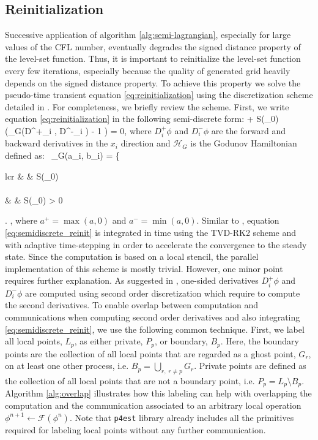 \subsection{Reinitialization}
Successive application of algorithm \ref{alg:semi-lagrangian}, especially for large values of the CFL number, eventually degrades the signed distance property of the level-set function. Thus, it is important to reinitialize the level-set function every few iterations, especially because the quality of generated grid heavily depends on the signed distance property. To achieve this property we solve the pseudo-time transient equation \eqref{eq:reinitialization} using the discretization scheme detailed in \cite{Min;Gibou:07:A-second-order-accur}. For completeness, we briefly review the scheme. First, we write equation \eqref{eq:reinitialization} in the following semi-discrete form:
\be
{} + S(\phi_0) \left(_G(D^+_i \phi, D^-_i \phi) - 1 \right) = 0,
\label{eq:semidiscrete_reinit}
\ee
where $D^+_i \phi$ and $D^-_i \phi$ are the forward and backward derivatives in the $x_i$ direction and $\mathcal{H}_G$ is the Godunov Hamiltonian defined as:\
\ben
{}_G(a_i, b_i) = 
\left\{
\begin{array}{lcr}
	 & \hspace {5 mm}  & S(\phi_0)  \\
	\\
	 & \hspace {5 mm}  & S(\phi_0)  >  0 
\end{array}
\right.
,
\een
where $a^+ = \max(a, 0)$ and $a^- = \min(a, 0)$. Similar to \cite{Min;Gibou:07:A-second-order-accur}, equation \eqref{eq:semidiscrete_reinit} is integrated in time using the TVD-RK2 scheme and with adaptive time-stepping in order to accelerate the convergence to the steady state. Since the computation is based on a local stencil, the parallel implementation of this scheme is mostly trivial. However, one minor point requires further explanation. As suggested in \cite{Min;Gibou:07:A-second-order-accur}, one-sided derivatives $D^+_i \phi$ and $D^-_i \phi$ are computed using second order discretization which require to compute the second derivatives. To enable overlap between computation and communications when computing second order derivatives and also integrating \eqref{eq:semidiscrete_reinit}, we use the following common technique. First, we label all local points, $L_p$, as either private, $P_p$, or boundary, $B_p$. Here, the boundary points are the collection of all local points that are regarded as a ghost point, $G_r$, on at least one other process, i.e. $B_p = \underset{r,\;r\neq p}{\bigcup} G_r$. Private points are defined as the collection of all local points that are not a boundary point, i.e. $P_p = L_p \setminus B_p$. Algorithm \ref{alg:overlap} illustrates how this labeling can help with overlapping the computation and the communication associated to an arbitrary local operation $\phi^{n+1} \gets \mathcal{F}(\phi^n)$. Note that \texttt{p4est} library already includes all the primitives required for labeling local points without any further communication.

